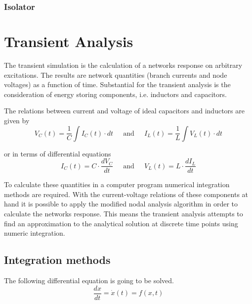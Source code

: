 \documentclass[10pt]{report}
\begin{document}
\subsection{Isolator}

\chapter{Transient Analysis}

The transient simulation is the calculation of a networks response on
arbitrary excitations.  The results are network quantities (branch
currents and node voltages) as a function of time.  Substantial for
the transient analysis is the consideration of energy storing
components, i.e. inductors and capacitors.

\addvspace{12pt}

The relations between current and voltage of ideal capacitors and
inductors are given by
\begin{equation}
V_C(t) = \dfrac{1}{C}\int I_C(t) \cdot dt
\;\;\;\; \textrm{ and } \;\;\;\;
I_L(t) = \dfrac{1}{L}\int V_L(t) \cdot dt
\end{equation}

or in terms of differential equations
\begin{equation}
I_C(t) = C\cdot \dfrac{d V_C}{d t}
\;\;\;\; \textrm{ and } \;\;\;\;
V_L(t) = L\cdot \dfrac{d I_L}{d t}
\end{equation}

To calculate these quantities in a computer program numerical
integration methods are required.  With the current-voltage relations
of these components at hand it is possible to apply the modified nodal
analysis algorithm in order to calculate the networks response.  This
means the transient analysis attempts to find an approximation to the
analytical solution at discrete time points using numeric integration.

\section{Integration methods}

The following differential equation is going to be solved.
\begin{equation}
\dfrac{d x}{d t} = \dot{x}(t) = f(x,t)
\label{eq:IntEquation}
\end{equation}
\end{document}
